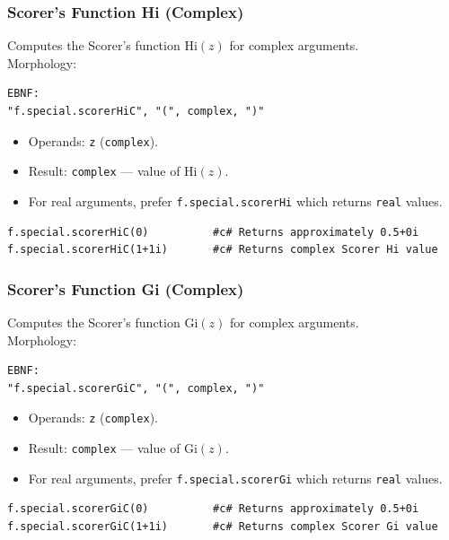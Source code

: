 \subsubsection{Scorer's Function Hi (Complex)}
Computes the Scorer's function $\text{Hi}(z)$ for complex arguments. \\
Morphology:
\begin{verbatim}
EBNF:
"f.special.scorerHiC", "(", complex, ")"
\end{verbatim}
\begin{itemize}
\item Operands: \texttt{z} (\texttt{complex}).
\item Result: \texttt{complex} --- value of $\text{Hi}(z)$.
\item For real arguments, prefer \texttt{f.special.scorerHi} which returns \texttt{real} values.
\end{itemize}
\begin{verbatim}
f.special.scorerHiC(0)          #c# Returns approximately 0.5+0i
f.special.scorerHiC(1+1i)       #c# Returns complex Scorer Hi value
\end{verbatim}

\subsubsection{Scorer's Function Gi (Complex)}
Computes the Scorer's function $\text{Gi}(z)$ for complex arguments. \\
Morphology:
\begin{verbatim}
EBNF:
"f.special.scorerGiC", "(", complex, ")"
\end{verbatim}
\begin{itemize}
\item Operands: \texttt{z} (\texttt{complex}).
\item Result: \texttt{complex} --- value of $\text{Gi}(z)$.
\item For real arguments, prefer \texttt{f.special.scorerGi} which returns \texttt{real} values.
\end{itemize}
\begin{verbatim}
f.special.scorerGiC(0)          #c# Returns approximately 0.5+0i
f.special.scorerGiC(1+1i)       #c# Returns complex Scorer Gi value
\end{verbatim}

